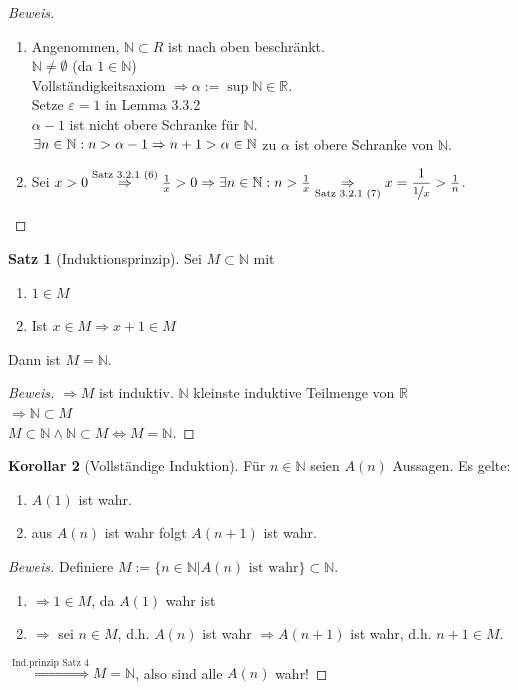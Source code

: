 \documentclass[12pt,a4paper,titlepage]{article} %
\theoremstyle{definition}
\newtheorem{satz}{Satz}[subsection]
\newtheorem{kor}[satz]{Korollar}
\theoremstyle{remark}
\newenvironment{bew}{\begin{proof}[Beweis]}{\end{proof}}
\begin{document}
\begin{bew}
	\begin{enumerate}
		\item Angenommen, $\mathbb{N}\subset{R}$ ist nach oben beschränkt.\\
		$\mathbb{N} \neq \emptyset$ (da $1\in\mathbb{N}$)\\
		Vollständigkeitsaxiom $\Rightarrow \alpha := \sup \mathbb{N} \in \mathbb{R}$.\\
		Setze $\varepsilon = 1$ in Lemma 3.3.2\\ %
		$\alpha -1$ ist nicht obere Schranke für $\mathbb{N}$.\\
		$\exists n\in \mathbb{N}: n>\alpha-1\\
		\Rightarrow n+1 > \alpha \in \mathbb{N}$ \Lightning  zu $\alpha$ ist obere Schranke von $\mathbb{N}$.
		\item Sei $x>0 \overset{\text{Satz 3.2.1 (6)}}{\Rightarrow} \frac{1}{x} > 0\Rightarrow \exists n\in \mathbb{N}: n > \frac{1}{x}\underset{\text{Satz 3.2.1 (7)}}{\Rightarrow} x = \dfrac{1}{\nicefrac{1}{x}} > \frac{1}{n}$. %
	\end{enumerate}
\end{bew}
\begin{satz}[Induktionsprinzip]
	Sei $M\subset \mathbb{N}$ mit 
	\begin{enumerate}
		\item $1\in M$
		\item Ist $x\in M \Rightarrow x+1 \in M$
	\end{enumerate}
	Dann ist $M= \mathbb{N}$.
\end{satz}
\begin{bew}
	$\Rightarrow M$ ist induktiv. $\mathbb{N}$ kleinste induktive Teilmenge von $\mathbb{R}$\\
	$\Rightarrow \mathbb{N} \subset M$\\
	$M\subset \mathbb{N} \wedge \mathbb{N} \subset M \Leftrightarrow M = \mathbb{N}$.
\end{bew}
\begin{kor}[Vollständige Induktion]
	Für $n\in\mathbb{N}$ seien $A(n)$ Aussagen.
	Es gelte:
	\begin{enumerate}
		\item $A(1)$ ist wahr.
		\item aus $A(n)$ ist wahr folgt $A(n+1)$ ist wahr.
	\end{enumerate}
\end{kor}
\begin{bew}
	Definiere $M := \{n\in \mathbb{N}| A(n) \text{ ist wahr}\} \subset \mathbb{N}$.
	\begin{enumerate}
		\item $\Rightarrow 1\in M$, da $A(1)$ wahr ist
		\item $\Rightarrow$ sei $n\in M$, d.h. $A(n)$ ist wahr $\Rightarrow A(n+1)$ ist wahr, d.h. $n+1\in M$.
	\end{enumerate}
	$\overset{\text{Ind.prinzip Satz 4}}{\Rightarrow} M = \mathbb{N}$, also sind alle $A(n)$ wahr! %
\end{bew}
\end{document}

